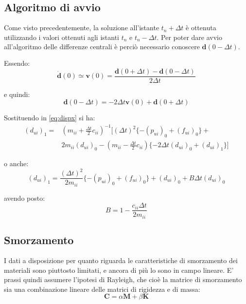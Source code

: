 \subsection{Algoritmo di avvio}
Come visto precedentemente, la soluzione all'istante $t_n + \varDelta t$ è ottenuta 
utilizzando i valori ottenuti agli istanti $t_n$ e $t_n - \varDelta t$. 
Per poter dare avvio all'algoritmo delle differenze centrali è perciò necessario
conoscere $\boldsymbol{d}(0-\varDelta t)$.

Essendo:
\begin{equation}
	 \boldsymbol{\dot{d}}(0) \simeq \boldsymbol{v}(0) = \frac{\boldsymbol{d}(0 + \varDelta t) - \boldsymbol{d}(0 - \varDelta t)}{2 \varDelta t}
\end{equation}

e quindi:
\begin{equation}
	\boldsymbol{d}(0 - \varDelta t) = -2\varDelta t \boldsymbol{v}(0) + \boldsymbol{d}(0 + \varDelta t)
\end{equation}

Sostituendo in \ref{eq:dispx} si ha:
\begin{equation} 
	\begin{split}
		(d_{ui})_1 = & (m_{ii} + \frac{\varDelta t}{2} c_{ii})^{-1} [(\varDelta t)^2 \{ - (p_{ui})_0 + (f_{ui})_0 \} + \\ 
		&2 m_{ii} (d_{ui})_0 - (m_{ii} - \frac{\varDelta t}{2} c_{ii}) \{-2 \varDelta t (d_{ui})_0 + (d_{ui})_1 \} ]
	\end{split} 
\end{equation}

o anche:
\begin{equation}
		(d_{ui})_1 = \frac{(\varDelta t)^2}{2 m_{ii}} \{ -(p_{ui})_0 + (f_{ui})_0 \} + (d_{ui})_0 + B\varDelta t (d_{ui})_0
\end{equation}

avendo posto:
\begin{equation*}
	B = 1- \frac{c_{ii}\varDelta t}{2m_{ii}}
\end{equation*}

\subsection{Smorzamento}
I dati a disposizione per quanto riguarda le caratteristiche di smorzamento dei materiali
sono piuttosto limitati, e ancora di più lo sono in campo lineare. E' prassi quindi assumere
l'ipotesi di Rayleigh, che cioè la matrice di smorzamento sia una combinazione lineare
delle matrici di rigidezza e di massa:
\begin{equation}
	\boldsymbol{C} = \alpha \boldsymbol{M} + \beta \boldsymbol{K}
\end{equation}

